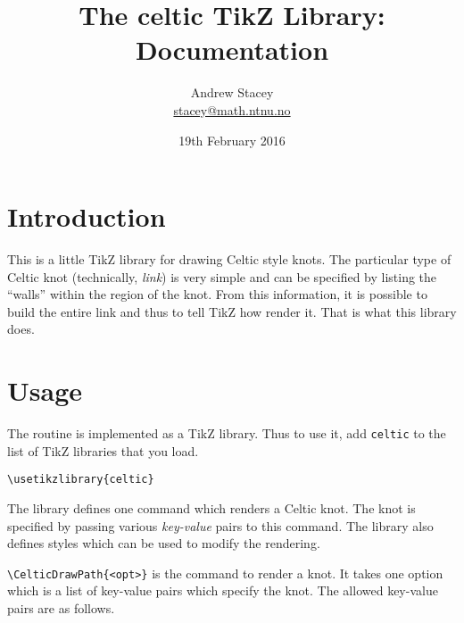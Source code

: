 \documentclass{ltxdoc}
\title{The \textsf{celtic} TikZ Library: Documentation}
\author{Andrew Stacey \\ \url{stacey@math.ntnu.no}}
\date{19th February 2016}
\begin{document}
\VerbatimFootnotes
\maketitle

\begin{center}
\end{center}

\section{Introduction}

This is a little TikZ library for drawing Celtic style knots.
The particular type of Celtic knot (technically, \emph{link}) is very simple and can be specified by listing the ``walls'' within the region of the knot.
From this information, it is possible to build the entire link and thus to tell TikZ how render it.
That is what this library does.

\section{Usage}

The routine is implemented as a TikZ library.
Thus to use it, add \Verb+celtic+ to the list of TikZ libraries that you load.

\begin{verbatim}
\usetikzlibrary{celtic}
\end{verbatim}

The library defines one command which renders a Celtic knot.
The knot is specified by passing various \emph{key-value} pairs to this command.
The library also defines styles which can be used to modify the rendering.

\DescribeMacro{\CelticDrawPath}\Verb+\CelticDrawPath{<opt>}+ is the command to render a knot.
It takes one option which is a list of key-value pairs which specify the knot.
The allowed key-value pairs are as follows.
\end{document}
